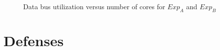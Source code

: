 \documentclass{iacrtrans}
\begin{document}
\begin{figure}%
    \centering
    \qquad
    \caption{Data bus utilization versus number of cores for $Exp_A$ and $Exp_B$}%
    \label{fig:databus}%
\end{figure}
\section{Defenses}



\end{document}
